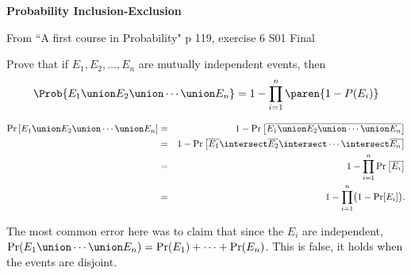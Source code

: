 \begin{problem} \textbf{Probability Inclusion-Exclusion}
\begin{staffnotes}
From ``A first course in Probability"
p 119, exercise 6
S01 Final
\end{staffnotes}

Prove that if $E_1, E_2,\ldots,E_n$ are mutually independent events, then
\[
\Prob{E_1\union E_2\union \cdots \union E_n} = 1-\prod^n_{i=1}\paren{1-P(E_i)}
\]

\begin{solution}
  \begin{eqnarray*}
    \Pr\left[E_1\union E_2\union \cdots \union E_n\right] &=&
    1 - \Pr\left[\overline{E_1\union E_2\union \cdots \union E_n}\right] \\
    &=&
    1 - \Pr\left[\overline{E_1} \intersect \overline{E_2} \intersect
      \cdots \intersect \overline{E_n}\right] \\
    &=&
    1 - \prod_{i=1}^n\Pr\left[\overline{E_i}\right] \\
    &=&
    1 - \prod_{i=1}^n\bigl(1 - \Pr[E_i]\bigr).
  \end{eqnarray*}
  
  The most common error here was to claim that since the $E_i$ are
  independent, $\Pr(E_1 \union \cdots \union E_n) = \Pr(E_1) + \cdots
  + \Pr(E_n)$. This is false, it holds when the events are disjoint.
\end{solution}

\end{problem}

